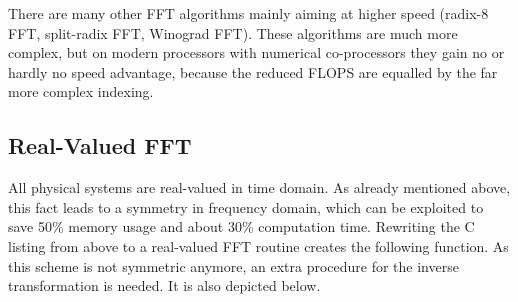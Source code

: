 \addvspace{12pt}

There are many other FFT algorithms mainly aiming at higher speed
(radix-8 FFT, split-radix FFT, Winograd FFT). These algorithms are
much more complex, but on modern processors with numerical co-processors
they gain no or hardly no speed advantage, because the reduced FLOPS
are equalled by the far more complex indexing.


\subsection{Real-Valued FFT}

All physical systems are real-valued in time domain. As already
mentioned above, this fact leads to a symmetry in frequency
domain, which can be exploited to save 50\% memory usage and
about 30\% computation time. Rewriting the C listing from above
to a real-valued FFT routine creates the following function.
As this scheme is not symmetric anymore, an extra procedure
for the inverse transformation is needed. It is also depicted
below.

